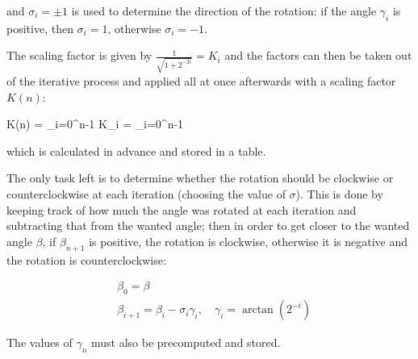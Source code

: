 and $\sigma_{i} = \pm 1$ is used to determine the direction of the rotation: if the angle $\gamma _{i}$ is positive, then $\sigma _{i} = 1$, otherwise $\sigma _{i} = -1$.

The scaling factor is given by $\frac {1}{\sqrt {1+2^{-2i}}} = K_{i}$ and the factors can then be taken out of the iterative process and applied all at once afterwards with a scaling factor $K(n)$:

\bee    
K(n) = \prod_{i=0}^{n-1} K_{i} = \prod_{i=0}^{n-1} 
\eee

which is calculated in advance and stored in a table.

The only task left is to determine whether the rotation should be clockwise or counterclockwise at each iteration (choosing the value of $\sigma$). This is done by keeping track of how much the angle was rotated at each iteration and subtracting that from the wanted angle; then in order to get closer to the wanted angle $\beta$, if $\beta_{n+1}$ is positive, the rotation is clockwise, otherwise it is negative and the rotation is counterclockwise:

\begin{align*}
    &\beta_{0} =\beta \\
    &\beta_{i+1} = \beta_{i} - \sigma_{i}\gamma_{i}, \quad \gamma_{i} = \arctan(2^{-i})
\end{align*}
    
The values of $\gamma_{n}$ must also be precomputed and stored.



